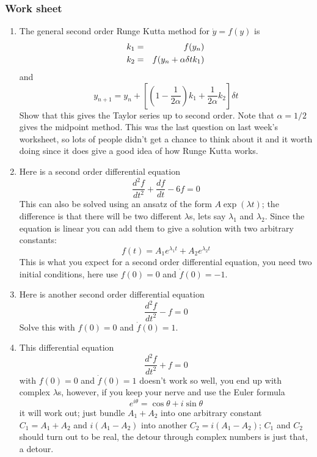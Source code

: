 \documentclass[12pt]{article}
\begin{document}
\subsubsection*{Work sheet}

\begin{enumerate}

\item The general second order Runge Kutta method for $\dot{y}=f(y)$ is
\begin{eqnarray}
k_1&=&f(y_n)\cr
k_2&=&f(y_n+\alpha \delta t k_1)
\end{eqnarray}
and
\begin{equation}
y_{n+1}=y_n+\left[\left(1-\frac{1}{2\alpha}\right)k_1+\frac{1}{2\alpha}k_2\right]\delta t
\end{equation}
Show that this gives the Taylor series up to second order. Note that
$\alpha=1/2$ gives the midpoint method. This was the last question on
last week's worksheet, so lots of people didn't get a chance to think
about it and it worth doing since it does give a good idea of how
Runge Kutta works.

\item Here is a second order differential equation
\begin{equation}
\frac{d^2f}{dt^2}+\frac{df}{dt}-6f=0
\end{equation}
This can also be solved using an ansatz of the form $A\exp{(\lambda
  t)}$; the difference is that there will be two different $\lambda$s, lets say $\lambda_1$ and $\lambda_2$. Since the equation is linear you can add them to give a solution with two arbitrary constants:
\begin{equation}
f(t)=A_1e^{\lambda_1t}+A_2e^{\lambda_2 t}
\end{equation}
This is what you expect for a second order differential equation, you
need two initial conditions, here use $f(0)=0$ and $\dot{f}(0)=-1$.

\item Here is another second order differential equation
\begin{equation}
\frac{d^2f}{dt^2}-f=0
\end{equation}
Solve this with $f(0)=0$ and $\dot{f}(0)=1$.

\item This differential equation
\begin{equation}
\frac{d^2f}{dt^2}+f=0
\end{equation}
with $f(0)=0$ and $\dot{f}(0)=1$ doesn't work so well, you end up with
complex $\lambda$s, however, if you keep your nerve and use the Euler formula
\begin{equation}
e^{i\theta}=\cos{\theta}+i\sin{\theta}
\end{equation}
it will work out; just bundle $A_1+A_2$ into one arbitrary constant
$C_1=A_1+A_2$ and $i(A_1-A_2)$ into another $C_2=i(A_1-A_2)$; $C_1$
and $C_2$ should turn out to be real, the detour through complex
numbers is just that, a detour.


\end{enumerate}
\end{document}
